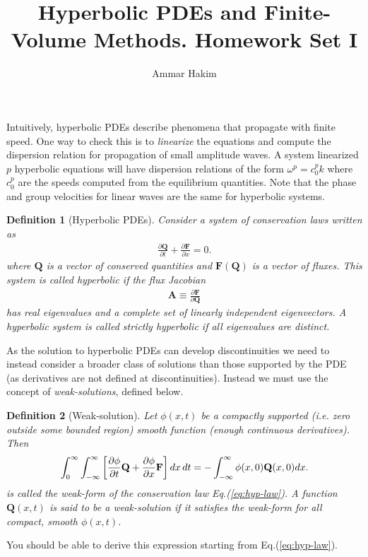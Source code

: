 \documentclass[11pt]{article}
\title{Hyperbolic PDEs and Finite-Volume Methods. Homework Set I}%
\author{Ammar Hakim}%
\date{}%
\newtheorem{definition}{Definition}
\newcommand{\eqr}[1]{Eq.\thinspace(#1)}
\newcommand{\pfrac}[2]{\frac{\partial #1}{\partial #2}}
\newcommand{\mvec}[1]{\mathbf{#1}}
\begin{document}
\maketitle

Intuitively, hyperbolic PDEs describe phenomena that propagate with
finite speed. One way to check this is to \emph{linearize} the
equations and compute the dispersion relation for propagation of small
amplitude waves. A system linearized $p$ hyperbolic equations will
have dispersion relations of the form $\omega^p = c_0^p k$ where
$c_0^p$ are the speeds computed from the equilibrium quantities. Note
that the phase and group velocities for linear waves are the same for
hyperbolic systems.

\begin{definition}[Hyperbolic PDEs]
  Consider a system of conservation laws written as
  \begin{align}
    \pfrac{\mvec{Q}}{t} + \pfrac{\mvec{F}}{x} = 0. \label{eq:hyp-law}
  \end{align}
  where $\mvec{Q}$ is a vector of conserved quantities and
  $\mvec{F}(\mvec{Q})$ is a vector of fluxes. This system is called
  \emph{hyperbolic} if the flux Jacobian
  \begin{align*}
    \mvec{A} \equiv \pfrac{\mvec{F}}{\mvec{Q}}
  \end{align*}
  has \emph{real eigenvalues} and a \emph{complete set of linearly
    independent} eigenvectors. A hyperbolic system is called
  \emph{strictly hyperbolic} if all eigenvalues are distinct.
\end{definition}

As the solution to hyperbolic PDEs can develop discontinuities we need
to instead consider a broader class of solutions than those supported
by the PDE (as derivatives are not defined at
discontinuities). Instead we must use the concept of
\emph{weak-solutions}, defined below.

\begin{definition}[Weak-solution]
  Let $\phi(x,t)$ be a compactly supported (i.e. zero outside some
  bounded region) smooth function (enough continuous
  derivatives). Then
  \begin{align*}
    \int_0^\infty  \int_{-\infty}^\infty 
    \bigg[\pfrac{\phi}{t} \mvec{Q} + \pfrac{\phi}{x} \mvec{F}\bigg]\thinspace
    dx\thinspace dt
    =
    -
    \int_{-\infty}^\infty \phi(x,0) \mvec{Q}(x,0) dx.
  \end{align*}
  is called the \emph{weak-form} of the conservation law
  \eqr{\ref{eq:hyp-law}}. A function $\mvec{Q}(x,t)$ is said to be a
  weak-solution if it satisfies the weak-form for all compact, smooth
  $\phi(x,t)$.
\end{definition}
\noindent You should be able to derive this expression starting from
\eqr{\ref{eq:hyp-law}}.
\end{document}
